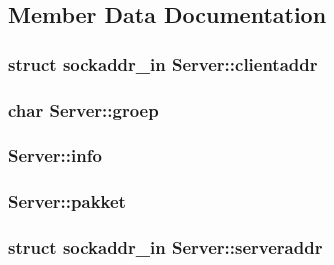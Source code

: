 \subsection{Member Data Documentation}
\hypertarget{classServer_aa98c616c610a9f34a62b6c9f71ef7309}{
\subsubsection[{clientaddr}]{\setlength{\rightskip}{0pt plus 5cm}struct sockaddr\-\_\-in Server\-::clientaddr\hspace{0.3cm}{\ttfamily [private]}}}\label{classServer_aa98c616c610a9f34a62b6c9f71ef7309}
\hypertarget{classServer_ae63c2574fcde32ea16b06b0bcb61b716}{
\subsubsection[{groep}]{\setlength{\rightskip}{0pt plus 5cm}char Server\-::groep\hspace{0.3cm}{\ttfamily [private]}}}\label{classServer_ae63c2574fcde32ea16b06b0bcb61b716}
\hypertarget{classServer_ae9d320c11dc676f6a24e41171bdd3beb}{
\subsubsection[{info}]{ Server\-::info\hspace{0.3cm}{\ttfamily [private]}}}\label{classServer_ae9d320c11dc676f6a24e41171bdd3beb}
\hypertarget{classServer_a7850c5e7c92a04edbbd682d6553c18c8}{
\subsubsection[{pakket}]{ Server\-::pakket\hspace{0.3cm}{\ttfamily [private]}}}\label{classServer_a7850c5e7c92a04edbbd682d6553c18c8}
\hypertarget{classServer_ac23e7b8d798bffefe61206636a8e1f57}{
\subsubsection[{serveraddr}]{\setlength{\rightskip}{0pt plus 5cm}struct sockaddr\-\_\-in Server\-::serveraddr\hspace{0.3cm}{\ttfamily [private]}}}\label{classServer_ac23e7b8d798bffefe61206636a8e1f57}
